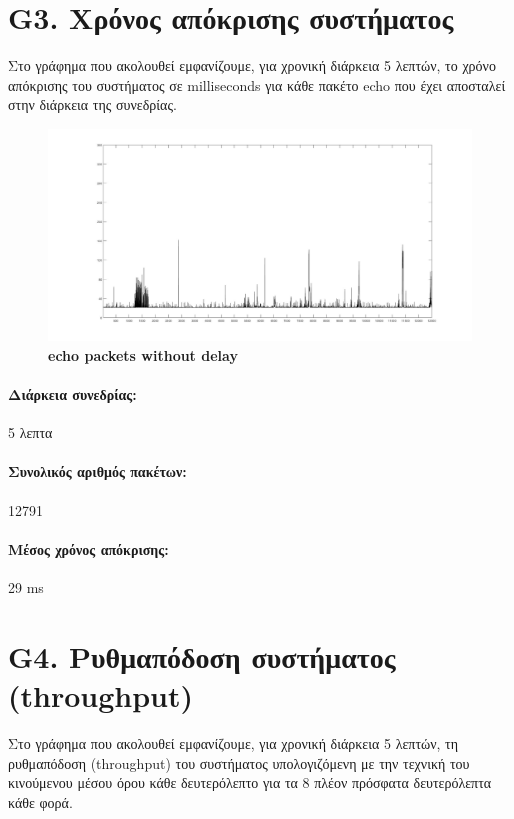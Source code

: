 \documentclass{article}
\begin{document}
\section*{G3. Χρόνος απόκρισης συστήματος}
Στο γράφημα που ακολουθεί εμφανίζουμε, για χρονική διάρκεια 5 λεπτών, το χρόνο απόκρισης του
συστήματος σε milliseconds για κάθε πακέτο echo που έχει αποσταλεί στην διάρκεια της συνεδρίας.

\begin{figure}[h!]
 \begin{center}
 \advance\leftskip-4cm
  \includegraphics[width=200mm,scale=0.7]{g3s2.jpg}
  \caption*{\textbf{echo packets without delay}}
  
\end{center}
\end{figure}
\paragraph{Διάρκεια συνεδρίας:} 5 λεπτα
\paragraph{Συνολικός αριθμός πακέτων: }12791
\paragraph{Μέσος χρόνος απόκρισης: }29 ms
\newpage
\large{}
\section*{G4. Ρυθμαπόδοση συστήματος (throughput)}
Στο γράφημα που ακολουθεί εμφανίζουμε, για χρονική διάρκεια 5 λεπτών, τη ρυθμαπόδοση (throughput) του συστήματος υπολογιζόμενη με
την τεχνική του κινούμενου μέσου όρου κάθε δευτερόλεπτο για τα 8 πλέον πρόσφατα δευτερόλεπτα κάθε φορά.
\end{document}
